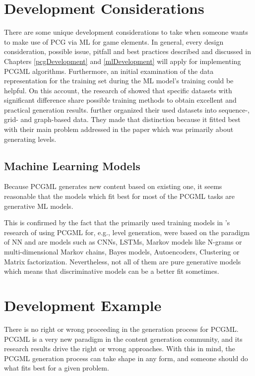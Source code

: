 \documentclass[MGS,Master,english]{twbook}%
\begin{document}
\section{Development Considerations} \label{PCGML::devConsiderations}
There are some unique development considerations to take when someone wants to make use of PCG via ML for game elements. In general, every design consideration, possible issue, pitfall and best practices described and discussed in Chapters \ref{pcgDevelopment} and \ref{mlDevelopment} will apply for implementing PCGML algorithms. Furthermore, an initial examination of the data representation for the training set during the ML model’s training could be helpful. On this account, the research of \citep{pcgml::paper} showed that specific datasets with significant difference share possible training methods to obtain excellent and practical generation results. \citep{pcgml::paper} further organized their used datasets into sequence-, grid- and graph-based data. They made that distinction because it fitted best with their main problem addressed in the paper which was primarily about generating levels.

\subsection{Machine Learning Models}
Because PCGML generates new content based on existing one, it seems reasonable that the models which fit best for most of the PCGML tasks are generative ML models.

This is confirmed by the fact that the primarily used training models in 's research of using PCGML for, e.g., level generation, were based on the paradigm of \ac{NN} and are models such as \acp{CNN}, \acp{LSTM}, Markov models like N-grams or multi-dimensional Markov chains, Bayes models, Autoencoders, Clustering or Matrix factorization. Nevertheless, not all of them are pure generative models which means that discriminative models can be a better fit sometimes.

\section{Development Example} \label{PCGML::devExample}
There is no right or wrong proceeding in the generation process for PCGML. PCGML is a very new paradigm in the content generation community, and its research results drive the right or wrong approaches. With this in mind, the PCGML generation process can take shape in any form, and someone should do what fits best for a given problem.
\end{document}
